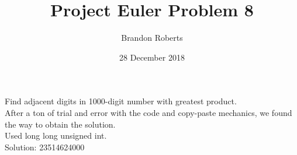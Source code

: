 \documentclass{article}
\begin{document}
\title{Project Euler Problem 8}
\author{Brandon Roberts}
\date{28 December 2018}

\maketitle

Find adjacent digits in 1000-digit number with greatest product.\\
After a ton of trial and error with the code and copy-paste mechanics, we found the way to obtain the solution.\\
Used long long unsigned int.\\
Solution: 23514624000
\end{document}
